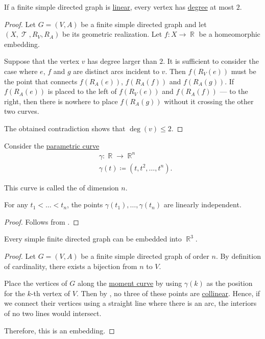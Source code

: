 \begin{proposition}\label{thm:linear_directed multigraph_equivalence}
  If a finite simple directed graph is \hyperref[def:graph_geometric_realization/linear]{linear}, every vertex has \hyperref[def:graph_cardinality/directed_degree]{degree} at most \( 2 \).
\end{proposition}
\begin{proof}
  Let \( G = (V, A) \) be a finite simple directed graph and let \( (X, \mscrT, R_V, R_A) \) be its geometric realization. Let \( f: X \to \BbbR \) be a homeomorphic embedding.

  Suppose that the vertex \( v \) has degree larger than \( 2 \). It is sufficient to consider the case where \( e \), \( f \) and \( g \) are distinct arcs incident to \( v \). Then \( f(R_V(e)) \) must be the point that connects \( f(R_A(e)) \), \( f(R_A(f)) \) and \( f(R_A(g)) \). If \( f(R_A(e)) \) is placed to the left of \( f(R_V(e)) \) and \( f(R_A(f)) \) --- to the right, then there is nowhere to place \( f(R_A(g)) \) without it crossing the other two curves.

  The obtained contradiction shows that \( \deg(v) \leq 2 \).
\end{proof}

\begin{proposition}\label{thm:moment_curve}
  Consider the \hyperref[def:parametric_curve]{parametric curve}
  \begin{equation*}
    \begin{aligned}
      &\gamma: \BbbR \to \BbbR^n \\
      &\gamma(t) \coloneqq (t, t^2, \ldots, t^n).
    \end{aligned}
  \end{equation*}

  This curve is called the  of dimension \( n \).

  For any \( t_1 < \ldots < t_n \), the points \( \gamma(t_1), \ldots, \gamma(t_n) \) are linearly independent.
\end{proposition}
\begin{proof}
  Follows from .
\end{proof}

\begin{proposition}\label{thm:directed_multigraph_can_be_embedded_into_r3}
  Every simple finite directed graph can be embedded into \( \BbbR^3 \).
\end{proposition}
\begin{proof}
  Let \( G = (V, A) \) be a finite simple directed graph of order \( n \). By definition of cardinality, there exists a bijection from \( n \) to \( V \).

  Place the vertices of \( G \) along the \hyperref[thm:moment_curve]{moment curve} by using \( \gamma(k) \) as the position for the \( k \)-th vertex of \( V \). Then by , no three of these points are \hyperref[def:collinear_points]{collinear}. Hence, if we connect their vertices using a straight line where there is an arc, the interiors of no two lines would intersect.

  Therefore, this is an embedding.
\end{proof}

